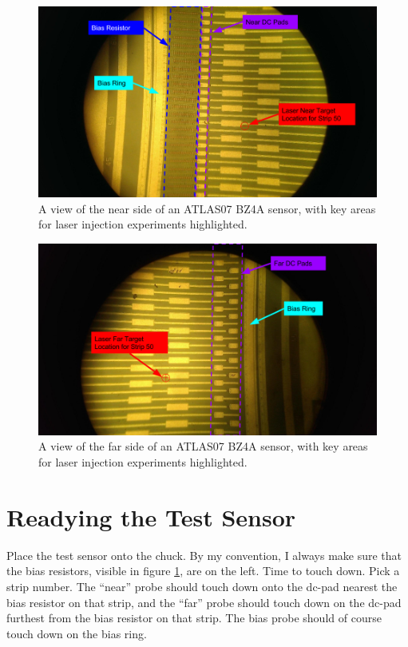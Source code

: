 \documentclass{report}
\begin{document}
            \begin{figure}[h] 
                \includegraphics[width=\textwidth]{sensor_near}
                \centering
                \caption{ A view of the near side of an ATLAS07 BZ4A sensor, with key areas for laser injection experiments highlighted. }
                \label{fig:sensor_near}
            \end{figure}

            \begin{figure}[h] 
                \includegraphics[width=\textwidth]{sensor_far}
                \centering
                \caption{ A view of the far side of an ATLAS07 BZ4A sensor, with key areas for laser injection experiments highlighted. }
                \label{fig:sensor_far}
            \end{figure}

        \section{ Readying the Test Sensor }
            Place the test sensor onto the chuck. By my convention, I always make sure that the bias resistors, visible in figure \ref{fig:sensor_near}, are on the left. Time to touch down. Pick a strip number. The ``near'' probe should touch down onto the dc-pad nearest the bias resistor on that strip, and the ``far'' probe should touch down on the dc-pad furthest from the bias resistor on that strip. The bias probe should of course touch down on the bias ring.
\end{document}
